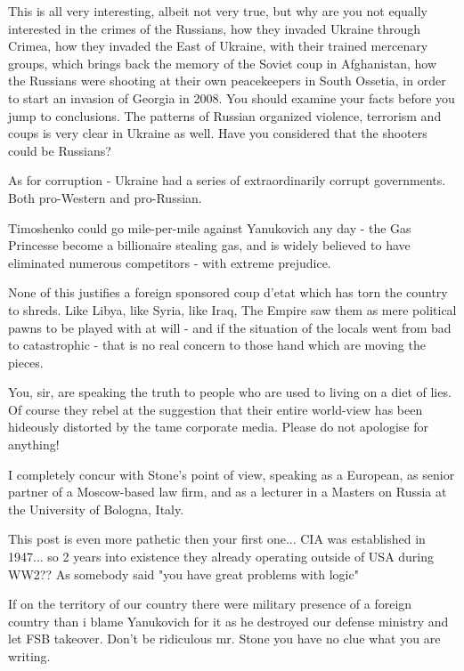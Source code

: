\begin{itemize}

This is all very interesting, albeit not very true, but why are you not equally
interested in the crimes of the Russians, how they invaded Ukraine through
Crimea, how they invaded the East of Ukraine, with their trained mercenary
groups, which brings back the memory of the Soviet coup in Afghanistan, how the
Russians were shooting at their own peacekeepers in South Ossetia, in order to
start an invasion of Georgia in 2008. You should examine your facts before you
jump to conclusions. The patterns of Russian organized violence, terrorism and
coups is very clear in Ukraine as well. Have you considered that the shooters
could be Russians?


As for corruption - Ukraine had a series of extraordinarily corrupt
governments. Both pro-Western and pro-Russian.

Timoshenko could go mile-per-mile against Yanukovich any day - the Gas
Princesse become a billionaire stealing gas, and is widely believed to have
eliminated numerous competitors - with extreme prejudice.

None of this justifies a foreign sponsored coup d'etat which has torn the
country to shreds. Like Libya, like Syria, like Iraq, The Empire saw them as
mere political pawns to be played with at will - and if the situation of the
locals went from bad to catastrophic - that is no real concern to those hand
which are moving the pieces.


You, sir, are speaking the truth to people who are used to living on a diet of
lies. Of course they rebel at the suggestion that their entire world-view has
been hideously distorted by the tame corporate media. Please do not apologise
for anything!

\begin{itemize} %

I completely concur with Stone's point of view, speaking as a European, as
senior partner of a Moscow-based law firm, and as a lecturer in a Masters on
Russia at the University of Bologna, Italy.

\end{itemize} %


This post is even more pathetic then your first one... CIA was established in
1947... so 2 years into existence they already operating outside of USA during
WW2?? As somebody said "you have great problems with logic"

If on the territory of our country there were military presence of a foreign
country than i blame Yanukovich for it as he destroyed our defense ministry and
let FSB takeover. Don't be ridiculous mr. Stone you have no clue what you are
writing.

\end{itemize} %
